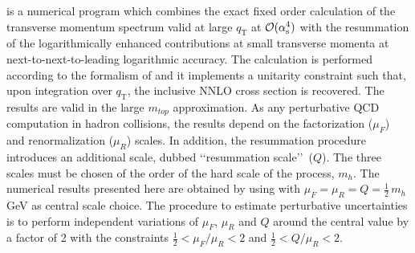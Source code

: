 \subsubsection{\hjetscompHqT}
\label{sec:hjetscomp:tools:ares:hqt}

\hjetscompHqT \cite{Bozzi:2005wk,deFlorian:2011xf} is a numerical program which 
combines the exact fixed order calculation of the transverse momentum 
spectrum valid at large $q_\text{T}$ at ${\cal O}(\alpha_\mathrm{s}^4)$ with the 
resummation of the logarithmically enhanced contributions at small 
transverse momenta at next-to-next-to-leading logarithmic accuracy.
The calculation is performed according to the formalism of 
\cite{Catani:2000vq,Bozzi:2005wk} and it implements a unitarity 
constraint such that, upon integration over $q_\text{T}$, the inclusive 
NNLO cross section is recovered. The results are valid in the large 
$m_{top}$ approximation. As any perturbative QCD computation in hadron 
collisions, the results depend on the factorization ($\mu_F$) and 
renormalization ($\mu_R$) scales. In addition, the resummation procedure 
introduces an additional scale, dubbed \lq\lq resummation scale\rq\rq\ 
($Q$). The three scales must be chosen of the order of the hard scale 
of the process, $m_h$. The numerical results presented here are obtained 
by using \hjetscompHqT-2.0 with $\mu_F=\mu_R=Q=\tfrac{1}{2}\,m_h$ GeV as central scale choice. 
The procedure to estimate perturbative uncertainties is to perform 
independent variations of $\mu_F$, $\mu_R$ and $Q$ around the central 
value by a factor of 2 with the constraints $\tfrac{1}{2} < \mu_F/\mu_R < 2$ and 
$\tfrac{1}{2} <Q/\mu_R<2$.